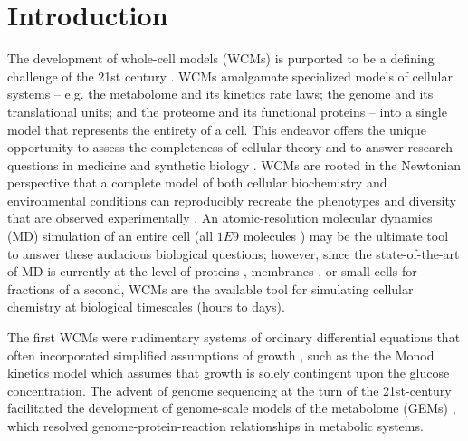 \label{WCMpy_chapter}

\section*{Introduction}
The development of whole-cell models (WCMs) \cite{Bhat2020Whole-CellSurvey} is purported to be a defining challenge of the 21st century \cite{Tomita2001Whole-cellCentury}. WCMs amalgamate specialized models of cellular systems -- e.g. the metabolome and its kinetics rate laws; the genome and its translational units; and the proteome and its functional proteins -- into a single model that represents the entirety of a cell. This endeavor offers the unique opportunity to assess the completeness of cellular theory \cite{Palsson2000TheBiology,Feig2019Whole-cellDetail} and to answer research questions in medicine \cite{Bordbar2015PersonalizedPharmacodynamics,Loscalzo2011SystemsMedicine} and synthetic biology \cite{Purcell2013TowardsBiology}. WCMs are rooted in the Newtonian perspective that a complete model of both cellular biochemistry and environmental conditions can reproducibly recreate the phenotypes and diversity that are observed experimentally \cite{Palsson2000TheNecessitate}. An atomic-resolution molecular dynamics (MD) simulation of an entire cell (all $1E9$ molecules \cite[][approximated from cellular mass]{Lewis2014MassPopulations}) may be the ultimate tool to answer these audacious biological questions; however, since the state-of-the-art of MD is currently at the level of proteins \cite{Adcock2006MolecularProteins}, membranes \cite{Egberts1994MolecularMembrane,Alper1993ComputerDynamics,Alper1993TheStudy}, or small cells \cite{Perilla2015MolecularComplexes} for fractions of a second, WCMs are the available tool for simulating cellular chemistry \cite{Feig2015CompleteBiology} at biological timescales (hours to days). 

The first WCMs \cite{Karr2015TheModeling} were rudimentary systems of ordinary differential equations that often incorporated simplified assumptions of growth \cite{PERRET1960APopulation}, such as the the Monod kinetics model \cite{Han1988ExtendedInhibition} which assumes that growth is solely contingent upon the glucose concentration. The advent of genome sequencing at the turn of the 21st-century \cite{Collins2003TheBiology, Covert2001MetabolicSilico} facilitated the development of genome-scale models of the metabolome (GEMs) \cite{Varma1994StoichiometricW3110,Edwards2000TheCapabilities}, which resolved genome-protein-reaction relationships \cite{Edwards2001InData} in metabolic systems. 

